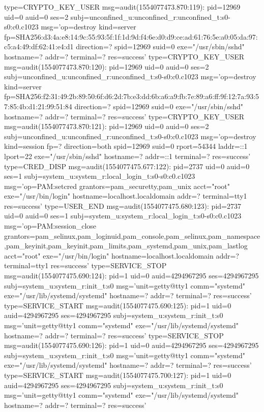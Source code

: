 \documentclass[]{report}
\newenvironment{Shaded}{}{}
\newcommand{\NormalTok}[1]{#1}
\begin{document}
\begin{Shaded}
\begin{Highlighting}[]
\NormalTok{type=CRYPTO_KEY_USER msg=audit(1554077473.870:119): pid=12969 uid=0 auid=0 ses=2 subj=unconfined_u:unconfined_r:unconfined_t:s0-s0:c0.c1023 msg='op=destroy kind=server fp=SHA256:d3:4a:e8:14:9c:55:93:5f:1f:1d:9d:f4:6e:d0:d9:ce:ad:61:76:5e:a0:05:da:97:c5:a4:49:df:62:41:e4:d1 direction=? spid=12969 suid=0  exe="/usr/sbin/sshd" hostname=? addr=? terminal=? res=success'}
\NormalTok{type=CRYPTO_KEY_USER msg=audit(1554077473.870:120): pid=12969 uid=0 auid=0 ses=2 subj=unconfined_u:unconfined_r:unconfined_t:s0-s0:c0.c1023 msg='op=destroy kind=server fp=SHA256:f2:31:49:2b:89:50:6f:d6:2d:7b:e3:dd:6b:a6:a9:fb:7e:89:a6:ff:9f:12:7a:93:57:85:4b:d1:21:99:51:84 direction=? spid=12969 suid=0  exe="/usr/sbin/sshd" hostname=? addr=? terminal=? res=success'}
\NormalTok{type=CRYPTO_KEY_USER msg=audit(1554077473.870:121): pid=12969 uid=0 auid=0 ses=2 subj=unconfined_u:unconfined_r:unconfined_t:s0-s0:c0.c1023 msg='op=destroy kind=session fp=? direction=both spid=12969 suid=0 rport=54344 laddr=::1 lport=22  exe="/usr/sbin/sshd" hostname=? addr=::1 terminal=? res=success'}
\NormalTok{type=CRED_DISP msg=audit(1554077475.677:122): pid=2737 uid=0 auid=0 ses=1 subj=system_u:system_r:local_login_t:s0-s0:c0.c1023 msg='op=PAM:setcred grantors=pam_securetty,pam_unix acct="root" exe="/usr/bin/login" hostname=localhost.localdomain addr=? terminal=tty1 res=success'}
\NormalTok{type=USER_END msg=audit(1554077475.680:123): pid=2737 uid=0 auid=0 ses=1 subj=system_u:system_r:local_login_t:s0-s0:c0.c1023 msg='op=PAM:session_close grantors=pam_selinux,pam_loginuid,pam_console,pam_selinux,pam_namespace,pam_keyinit,pam_keyinit,pam_limits,pam_systemd,pam_unix,pam_lastlog acct="root" exe="/usr/bin/login" hostname=localhost.localdomain addr=? terminal=tty1 res=success'}
\NormalTok{type=SERVICE_STOP msg=audit(1554077475.690:124): pid=1 uid=0 auid=4294967295 ses=4294967295 subj=system_u:system_r:init_t:s0 msg='unit=getty@tty1 comm="systemd" exe="/usr/lib/systemd/systemd" hostname=? addr=? terminal=? res=success'}
\NormalTok{type=SERVICE_START msg=audit(1554077475.690:125): pid=1 uid=0 auid=4294967295 ses=4294967295 subj=system_u:system_r:init_t:s0 msg='unit=getty@tty1 comm="systemd" exe="/usr/lib/systemd/systemd" hostname=? addr=? terminal=? res=success'}
\NormalTok{type=SERVICE_STOP msg=audit(1554077475.690:126): pid=1 uid=0 auid=4294967295 ses=4294967295 subj=system_u:system_r:init_t:s0 msg='unit=getty@tty1 comm="systemd" exe="/usr/lib/systemd/systemd" hostname=? addr=? terminal=? res=success'}
\NormalTok{type=SERVICE_START msg=audit(1554077475.700:127): pid=1 uid=0 auid=4294967295 ses=4294967295 subj=system_u:system_r:init_t:s0 msg='unit=getty@tty1 comm="systemd" exe="/usr/lib/systemd/systemd" hostname=? addr=? terminal=? res=success'}

\end{Highlighting}
\end{Shaded}
\end{document}
